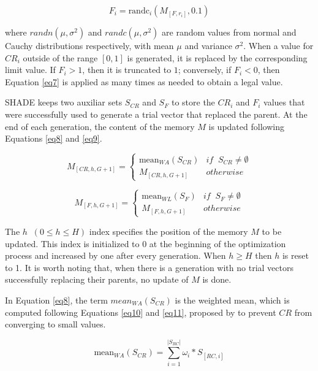 \documentclass[review]{elsarticle}
\begin{document}
\begin{equation}
F_i = \text{randc}_i(M_{[F,r_i]}, 0.1)
\label{eq7}
\end{equation}

where $randn(\mu, \sigma^2)$ and $randc(\mu, \sigma^2)$ are random values from normal and Cauchy distributions respectively, with mean $\mu$ and variance $\sigma^2$. When a value for $CR_i$ outside of the range $[0,1]$ is generated, it is replaced by the corresponding limit value. If $F_i > 1$, then it is truncated to $1$; conversely, if $F_i < 0$, then Equation \eqref{eq7} is applied as many times as needed to obtain a legal value.

SHADE keeps two auxiliar sets $S_{CR}$ and $S_F$ to store the $CR_i$ and $F_i$ values that were successfully used to generate a trial vector that replaced the parent. At the end of each generation, the content of the memory $M$ is updated following Equations \eqref{eq8} and \eqref{eq9}.

\begin{equation}
M_{[CR,h,G+1]} = \left\{ \begin{array}{lc}
\text{mean}_{WA} (S_{CR}) &   if \;\; S_{CR} \neq \emptyset \\
M_{[CR,h,G+1]} &  otherwise
\end{array}
\right.
\label{eq8}
\end{equation}

\begin{equation}
M_{[F,h,G+1]} = \left\{ \begin{array}{lc}
\text{mean}_{WL} (S_{F}) &   if \;\; S_{F} \neq \emptyset \\
M_{[F,h,G+1]} &  otherwise
\end{array}
\right.
\label{eq9}
\end{equation}

The $h \;\; (0 \le h \le H)$ index specifies the position of the memory $M$ to be updated. This index is initialized to $0$ at the beginning of the optimization process and increased by one after every generation. When $h \ge H$ then $h$ is reset to 1. It is worth noting that, when there is a generation with no trial vectors successfully replacing their parents, no update of $M$ is done.

In Equation \ref{eq8}, the term $mean_{WA} (S_{CR})$ is the weighted mean, which is computed following Equations \eqref{eq10} and \eqref{eq11}, proposed by \cite{peng2009multi} to prevent $CR$ from converging to small values.

\begin{equation}
\text{mean}_{WA} (S_{CR}) = \sum_{i = 1}^{|S_{RC}|} \omega_i * S_{[RC,i]}
\label{eq10}
\end{equation}
\end{document}
